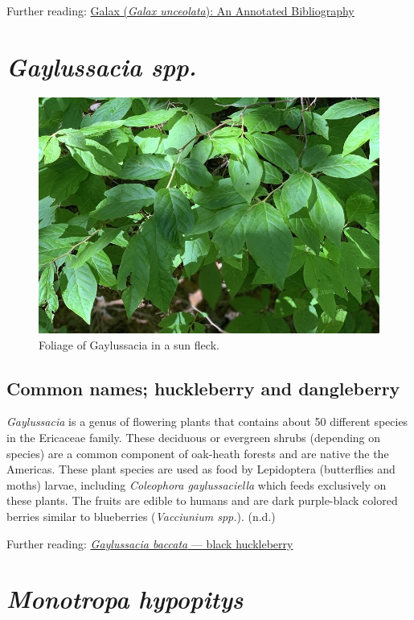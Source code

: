 \documentclass[
]{article}
\begin{document}
Further reading: \href{https://www.srs.fs.usda.gov/pubs/gtr/gtr_srs087.pdf}{Galax (\emph{Galax unceolata}): An Annotated Bibliography}

\hypertarget{gaylussacia-spp.}{%
\section{\texorpdfstring{\emph{Gaylussacia spp.}}{Gaylussacia spp.}}\label{gaylussacia-spp.}}

\begin{figure}

{\centering \includegraphics[width=0.5\linewidth]{galuss} 

}

\caption{Foliage of Gaylussacia in a sun fleck.}\label{fig:gayluss}
\end{figure}

\hypertarget{common-names-huckleberry-and-dangleberry}{%
\subsection{Common names; huckleberry and dangleberry}\label{common-names-huckleberry-and-dangleberry}}

\emph{Gaylussacia} is a genus of flowering plants that contains about 50 different species in the Ericaceae family. These deciduous or evergreen shrubs (depending on species) are a common component of oak-heath forests and are native the the Americas. These plant species are used as food by Lepidoptera (butterflies and moths) larvae, including \emph{Coleophora gaylussaciella} which feeds exclusively on these plants. The fruits are edible to humans and are dark purple-black colored berries similar to blueberries (\emph{Vacciunium spp.}). (n.d.)

Further reading: \href{https://www.fs.fed.us/wildflowers/beauty/mycotrophic/monotropa_hypopitys.shtml}{\emph{Gaylussacia baccata} --- black huckleberry}

\hypertarget{monotropa-hypopitys}{%
\section{\texorpdfstring{\emph{Monotropa hypopitys}}{Monotropa hypopitys}}\label{monotropa-hypopitys}}
\end{document}

